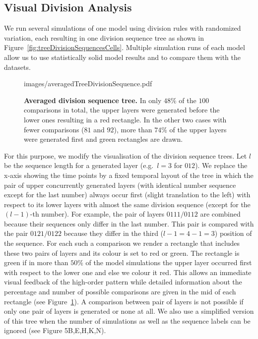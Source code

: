 \documentclass[11pt,a4paper, final]{article}
\begin{document}
\subsection{Visual Division Analysis}
\label{sec:visualAnalysis}
\noindent
We run several simulations of one model using division rules with randomized variation, each resulting in one division sequence tree as shown in Figure~\ref{fig:treeDivisionSequencesCells}. Multiple simulation runs of each model allow us to use statistically solid model results and to compare them with the datasets.
%
\begin{figure}[htbp]
	\begin{center}
		\begin{overpic}[width=0.4\linewidth]{images/averagedTreeDivisionSequence.pdf}
		\end{overpic}
\caption[]
{
{\bf Averaged division sequence tree.} In only $48 \%$ of the $100$ comparisons in total, the upper layers were generated before the lower ones resulting in a red rectangle. In the other two cases with fewer comparisons ($81$ and $92$), more than $74 \%$ of the upper layers were generated first and green rectangles are drawn.
}
	\label{fig:averagedTreeDivisionSequence}
	\end{center}
\end{figure}
%
For this purpose, we modify the visualisation of the division sequence trees. Let $l$ be the sequence length for a generated layer (e.g.\ $l=3$ for $012$). We replace the x-axis showing the time points by a fixed temporal layout of the tree in which the pair of upper concurrently generated layers (with identical number sequence except for the last number) always occur first (slight translation to the left) with respect to its lower layers with almost the same division sequence (except for the $(l-1)$-th number). For example, the pair of layers $0111/0112$ are combined because their sequences only differ in the last number. This pair is compared with the pair $0121/0122$ because they differ in the third ($l-1 = 4-1 = 3$) position of the sequence. For each such a comparison we render a rectangle that includes these two pairs of layers and its colour is set to red or green. The rectangle is green if in more than $50 \%$ of the model simulations the upper layer occurred first with respect to the lower one and else we colour it red. This allows an immediate visual feedback of the high-order pattern while detailed information about the percentage and number of possible comparisons are given in the mid of each rectangle (see Figure~\ref{fig:averagedTreeDivisionSequence}). A comparison between pair of layers is not possible if only one pair of layers is generated or none at all. We also use a simplified version of this tree when the number of simulations as well as the sequence labels can be ignored (see Figure 5B,E,H,K,N).
\end{document}
